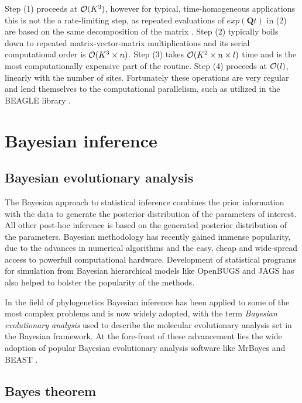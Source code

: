 \documentclass[12pt,twoside]{mitthesis}
\theoremstyle{plain}
\theoremstyle{definition}
\theoremstyle{remark}
\begin{document}
Step (1) proceeds at ${\cal{O}}(K^3)$, however for typical, time-homogeneous applications this is not the a rate-limiting step, as repeated evaluations of $exp(\mathbf{Q}t)$ in (2) are based on the same decomposition of the matrix \citep{Suchard2009}. 
Step (2) typically boils down to repeated matrix-vector-matrix multiplications and its serial computational order is ${\cal{O}}(K^3 \times n)$. 
Step (3) takes ${\cal{O}}(K^2 \times n \times l)$ time and is the most computationally expensive part of the routine. 
Step (4) proceeds at ${\cal{O}}(l)$, linearly with the number of sites.
Fortunately these operations are very regular and lend themselves to the computational parallelism, such as utilized in the BEAGLE library \citep{Suchard2009,Ayres2012}.


\section{Bayesian inference}

\subsection{Bayesian evolutionary analysis}

The Bayesian approach to statistical inference combines the prior information with the data to generate the posterior distribution of the parameters of interest.
All other post-hoc inference is based on the generated posterior distribution of the parameters.
Bayesian methodology has recently gained immense popularity, due to the advances in numerical algorithms and the easy, cheap and wide-spread access to powerfull computational hardware.
Development of statistical programs for simulation from Bayesian hierarchical models like OpenBUGS \citep{Lunn2009} and JAGS \citep{Plummer2003} has also helped to bolster the popularity of the methods.

In the field of phylogenetics Bayesian inference has been applied to some of the most complex problems and is now widely adopted, with the term \emph{Bayesian evolutionary analysis} used to describe the molecular evolutionary analysis set in the Bayesian framework.
At the fore-front of these advancement lies the wide adoption of popular Bayesian evolutionary analysis software like MrBayes \citep{Ronquist2012} and BEAST \citep{Drummond2012}.

\subsection{Bayes theorem}
\end{document}
